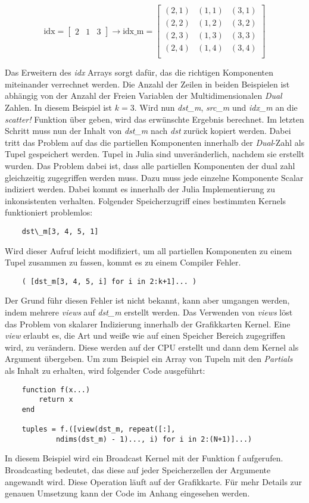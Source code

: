 \begin{equation}
\text{idx}= 
\begin{bmatrix}
 2 & 1 & 3
\end{bmatrix}
\rightarrow
\text{idx\_m} = 
\begin{bmatrix}
 (2, 1) & (1, 1) & (3, 1) \\ 
 (2, 2) & (1, 2) & (3, 2) \\
 (2, 3) & (1, 3) & (3, 3) \\
 (2, 4) & (1, 4) & (3, 4) \\
\end{bmatrix}
\end{equation}

Das Erweitern des \textit{idx} Arrays sorgt dafür, das die richtigen Komponenten miteinander verrechnet werden.
Die Anzahl der Zeilen in beiden Beispielen ist abhängig von der Anzahl der Freien Variablen  
der Multidimensionalen \textit{Dual} Zahlen. In diesem Beispiel ist $k = 3$.
Wird nun \textit{dst\_m}, \textit{src\_m} und \textit{idx\_m} an die \textit{scatter!} Funktion über
geben, wird das erwünschte Ergebnis berechnet. 
Im letzten Schritt muss nun der Inhalt von \textit{dst\_m} nach \textit{dst} zurück kopiert werden.
Dabei tritt das Problem auf das die partiellen Komponenten innerhalb der \textit{Dual}-Zahl
als Tupel gespeichert werden.
Tupel in Julia sind unveränderlich, nachdem sie erstellt wurden.
Das Problem dabei ist, dass alle partiellen Komponenten der dual zahl gleichzeitig zugegriffen werden muss.
Dazu muss jede einzelne Komponente Scalar indiziert werden.
Dabei kommt es innerhalb der Julia Implementierung zu inkonsistenten verhalten.
Folgender Speicherzugriff eines bestimmten Kernels funktioniert problemlos:


\begin{verbatim}
    dst\_m[3, 4, 5, 1]
\end{verbatim}
Wird dieser Aufruf leicht modifiziert, um all partiellen Komponenten zu einem Tupel zusammen zu fassen, 
kommt es zu einem Compiler Fehler.
\begin{verbatim}
    ( [dst_m[3, 4, 5, i] for i in 2:k+1]... )
\end{verbatim}
Der Grund führ diesen Fehler ist nicht bekannt, kann aber umgangen werden, indem mehrere \textit{views} auf
\textit{dst\_m} erstellt werden.
Das Verwenden von \textit{views} löst das Problem von skalarer Indizierung innerhalb der Grafikkarten Kernel. 
Eine \textit{view} erlaubt es, die Art und weiße wie auf einen Speicher Bereich zugegriffen wird, zu verändern.
Diese werden auf der CPU erstellt und dann dem Kernel als Argument übergeben.
Um zum Beispiel ein Array von Tupeln mit den \textit{Partials} als Inhalt zu erhalten, wird folgender Code ausgeführt:
\begin{verbatim}
	function f(x...)
		return x
	end
	
	tuples = f.([view(dst_m, repeat([:], 
	        ndims(dst_m) - 1)..., i) for i in 2:(N+1)]...)
\end{verbatim}
In diesem Beispiel wird ein Broadcast Kernel mit der Funktion f aufgerufen.
Broadcasting bedeutet, das diese auf jeder Speicherzellen der Argumente angewandt wird.
Diese Operation läuft auf der Grafikkarte.
Für mehr Details zur genauen Umsetzung kann der Code im Anhang eingesehen werden.
